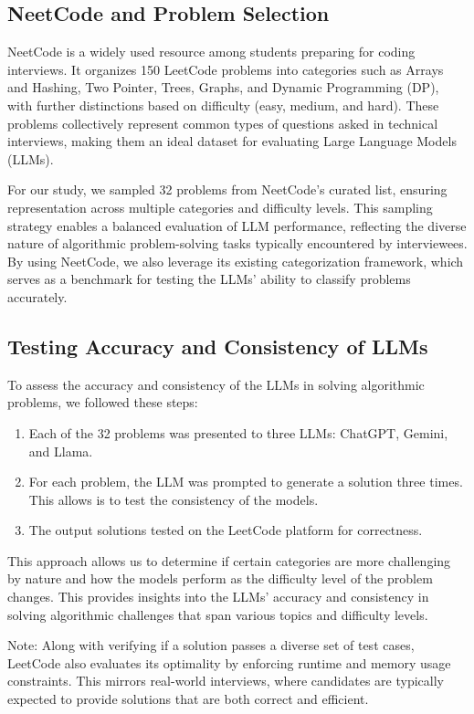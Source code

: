 \documentclass[times, 10pt,twocolumn]{article}
\begin{document}
\subsection{NeetCode and Problem Selection}
NeetCode is a widely used resource among students preparing for coding interviews. It organizes 150 LeetCode problems into categories such as Arrays and Hashing, Two Pointer, Trees, Graphs, and Dynamic Programming (DP), with further distinctions based on difficulty (easy, medium, and hard). These problems collectively represent common types of questions asked in technical interviews, making them an ideal dataset for evaluating Large Language Models (LLMs).

For our study, we sampled 32 problems from NeetCode's curated list, ensuring representation across multiple categories and difficulty levels. This sampling strategy enables a balanced evaluation of LLM performance, reflecting the diverse nature of algorithmic problem-solving tasks typically encountered by interviewees. By using NeetCode, we also leverage its existing categorization framework, which serves as a benchmark for testing the LLMs' ability to classify problems accurately.

\subsection{Testing Accuracy and Consistency of LLMs}
To assess the accuracy and consistency of the LLMs in solving algorithmic problems, we followed these steps:

\begin{enumerate}
    \item Each of the 32 problems was presented to three LLMs: ChatGPT, Gemini, and Llama.
    \item For each problem, the LLM was prompted to generate a solution three times. This allows is to test the consistency of the models.
    \item The output solutions tested on the LeetCode platform for correctness.
\end{enumerate}

This approach allows us to determine if certain categories are more challenging by nature and how the models perform as the difficulty level of the problem changes. This provides insights into the LLMs' accuracy and consistency in solving algorithmic challenges that span various topics and difficulty levels.

Note: Along with verifying if a solution passes a diverse set of test cases, LeetCode also evaluates its optimality by enforcing runtime and memory usage constraints. This mirrors real-world interviews, where candidates are typically expected to provide solutions that are both correct and efficient.
\end{document}
